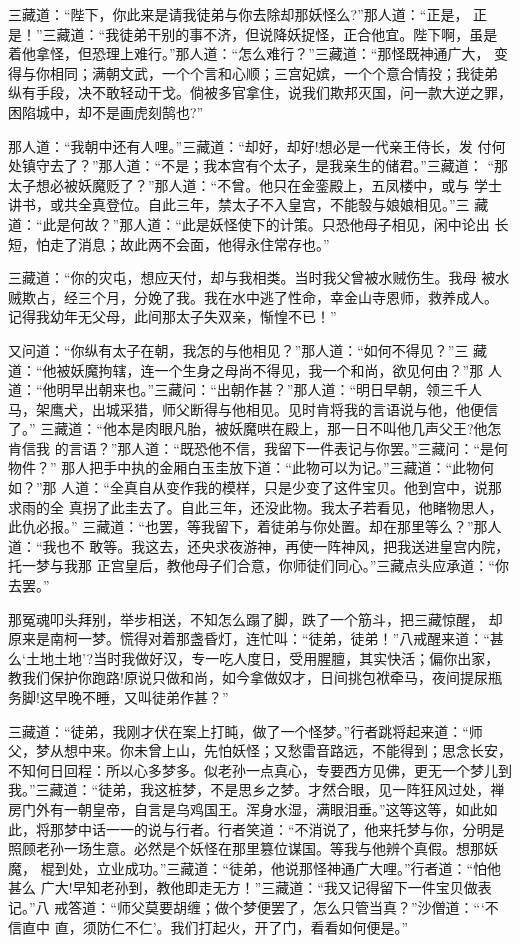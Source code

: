 三藏道：“陛下，你此来是请我徒弟与你去除却那妖怪么?”那人道：“正是，
正是！”三藏道：“我徒弟干别的事不济，但说降妖捉怪，正合他宜。陛下啊，虽是
着他拿怪，但恐理上难行。”那人道：“怎么难行？”三藏道：“那怪既神通广大，
变得与你相同；满朝文武，一个个言和心顺；三宫妃嫔，一个个意合情投；我徒弟
纵有手段，决不敢轻动干戈。倘被多官拿住，说我们欺邦灭国，问一款大逆之罪，
困陷城中，却不是画虎刻鹄也?”

那人道：“我朝中还有人哩。”三藏道：“却好，却好!想必是一代亲王侍长，发
付何处镇守去了？”那人道：“不是；我本宫有个太子，是我亲生的储君。”三藏道：
“那太子想必被妖魔贬了？”那人道：“不曾。他只在金銮殿上，五凤楼中，或与
学士讲书，或共全真登位。自此三年，禁太子不入皇宫，不能彀与娘娘相见。”三
藏道：“此是何故？”那人道：“此是妖怪使下的计策。只恐他母子相见，闲中论出
长短，怕走了消息；故此两不会面，他得永住常存也。”

三藏道：“你的灾屯，想应天付，却与我相类。当时我父曾被水贼伤生。我母
被水贼欺占，经三个月，分娩了我。我在水中逃了性命，幸金山寺恩师，救养成人。
记得我幼年无父母，此间那太子失双亲，惭惶不已！”

又问道：“你纵有太子在朝，我怎的与他相见？”那人道：“如何不得见？”三
藏道：“他被妖魔拘辖，连一个生身之母尚不得见，我一个和尚，欲见何由？”那
人道：“他明早出朝来也。”三藏问：“出朝作甚？”那人道：“明日早朝，领三千人
马，架鹰犬，出城采猎，师父断得与他相见。见时肯将我的言语说与他，他便信了。”
三藏道：“他本是肉眼凡胎，被妖魔哄在殿上，那一日不叫他几声父王?他怎肯信我
的言语？”那人道：“既恐他不信，我留下一件表记与你罢。”三藏问：“是何物件？”
那人把手中执的金厢白玉圭放下道：“此物可以为记。”三藏道：“此物何如？”那
人道：“全真自从变作我的模样，只是少变了这件宝贝。他到宫中，说那求雨的全
真拐了此圭去了。自此三年，还没此物。我太子若看见，他睹物思人，此仇必报。”
三藏道：“也罢，等我留下，着徒弟与你处置。却在那里等么？”那人道：“我也不
敢等。我这去，还央求夜游神，再使一阵神风，把我送进皇宫内院，托一梦与我那
正宫皇后，教他母子们合意，你师徒们同心。”三藏点头应承道：“你去罢。”

那冤魂叩头拜别，举步相送，不知怎么蹋了脚，跌了一个筋斗，把三藏惊醒，
却原来是南柯一梦。慌得对着那盏昏灯，连忙叫：“徒弟，徒弟！”八戒醒来道：“甚
么‘土地土地’?当时我做好汉，专一吃人度日，受用腥膻，其实快活；偏你出家，
教我们保护你跑路!原说只做和尚，如今拿做奴才，日间挑包袱牵马，夜间提尿瓶
务脚!这早晚不睡，又叫徒弟作甚？”

三藏道：“徒弟，我刚才伏在案上打盹，做了一个怪梦。”行者跳将起来道：“师
父，梦从想中来。你未曾上山，先怕妖怪；又愁雷音路远，不能得到；思念长安，
不知何日回程：所以心多梦多。似老孙一点真心，专要西方见佛，更无一个梦儿到
我。”三藏道：“徒弟，我这桩梦，不是思乡之梦。才然合眼，见一阵狂风过处，禅
房门外有一朝皇帝，自言是乌鸡国王。浑身水湿，满眼泪垂。”这等这等，如此如
此，将那梦中话一一的说与行者。行者笑道：“不消说了，他来托梦与你，分明是
照顾老孙一场生意。必然是个妖怪在那里篡位谋国。等我与他辨个真假。想那妖魔，
棍到处，立业成功。”三藏道：“徒弟，他说那怪神通广大哩。”行者道：“怕他甚么
广大!早知老孙到，教他即走无方！”三藏道：“我又记得留下一件宝贝做表记。”八
戒答道：“师父莫要胡缠；做个梦便罢了，怎么只管当真？”沙僧道：“‘不信直中
直，须防仁不仁’。我们打起火，开了门，看看如何便是。”


